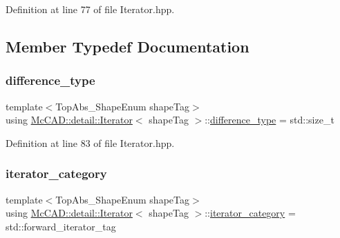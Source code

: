 Definition at line 77 of file Iterator.\+hpp.



\subsection{Member Typedef Documentation}
\mbox{\label{classMcCAD_1_1detail_1_1Iterator_a2d88b5eee2150a77a3a80f9662155b1d}} 
\subsubsection{\texorpdfstring{difference\+\_\+type}{difference\_type}}
{\footnotesize\ttfamily template$<$Top\+Abs\+\_\+\+Shape\+Enum shape\+Tag$>$ \\
using \hyperlink{classMcCAD_1_1detail_1_1Iterator}{Mc\+C\+A\+D\+::detail\+::\+Iterator}$<$ shape\+Tag $>$\+::\hyperlink{classMcCAD_1_1detail_1_1Iterator_a2d88b5eee2150a77a3a80f9662155b1d}{difference\+\_\+type} =  std\+::size\+\_\+t}



Definition at line 83 of file Iterator.\+hpp.

\mbox{\label{classMcCAD_1_1detail_1_1Iterator_a07b12fbe05817cbfe4cb3ef7c9c9162a}} 
\subsubsection{\texorpdfstring{iterator\+\_\+category}{iterator\_category}}
{\footnotesize\ttfamily template$<$Top\+Abs\+\_\+\+Shape\+Enum shape\+Tag$>$ \\
using \hyperlink{classMcCAD_1_1detail_1_1Iterator}{Mc\+C\+A\+D\+::detail\+::\+Iterator}$<$ shape\+Tag $>$\+::\hyperlink{classMcCAD_1_1detail_1_1Iterator_a07b12fbe05817cbfe4cb3ef7c9c9162a}{iterator\+\_\+category} =  std\+::forward\+\_\+iterator\+\_\+tag}



